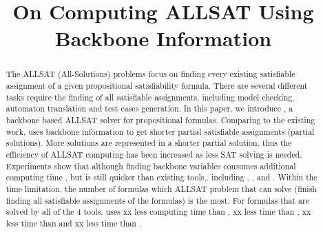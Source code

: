 \documentclass{article}
\begin{document}
\title{On Computing ALLSAT Using Backbone Information}
\maketitle
\begin{abstract}
The ALLSAT (All-Solutions) problems focus on finding every existing satisfiable assignment of a given propositional satisfiability formula. There are several different tasks require the finding of all satisfiable assignments, including model checking, automaton translation and test cases generation.
In this paper, we introduce \tool, a backbone based ALLSAT solver for propositional formulas. Comparing to the existing work, \tool uses backbone information to get shorter partial satisfiable assignments (partial solutions). More solutions are represented in a shorter partial solution, thus the efficiency of ALLSAT computing has been increased as less SAT solving is needed.
Experiments show that although finding backbone variables consumes additional computing time , but \tool is still quicker than existing tools,. including \ctool, \bc, \nbc and \bdd. Within the time limitation, the number of formulas which ALLSAT problem that \tool can solve (finish finding all satisfiable assignments of the formulas) is the most. For formulas that are solved by all of the 4 tools, \tool uses xx less computing time than \ctool, xx less time than \bc, xx less time than \nbc and xx less time than \bdd.
\end{abstract}





\end{document}

